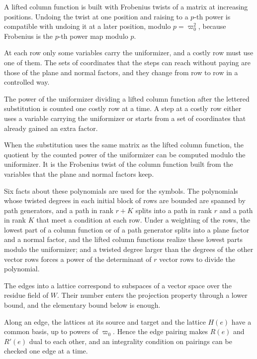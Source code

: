 A lifted column function is built with Frobenius twists of a matrix at increasing positions. Undoing the
twist at one position and raising to a $p$-th power is compatible with undoing it at a later position,
modulo $p=\varpi_0^2$, because Frobenius is the $p$-th power map modulo $p$.

At each row only some variables carry the uniformizer, and a costly row must use one of them. The sets of
coordinates that the steps can reach without paying are those of the plane and normal factors, and they
change from row to row in a controlled way.

The power of the uniformizer dividing a lifted column function after the lettered substitution is counted
one costly row at a time. A step at a costly row either uses a variable carrying the uniformizer or
starts from a set of coordinates that already gained an extra factor.

When the substitution uses the same matrix as the lifted column function, the quotient by the counted
power of the uniformizer can be computed modulo the uniformizer. It is the Frobenius twist of the column
function built from the variables that the plane and normal factors keep.

Six facts about these polynomials are used for the symbols. The polynomials whose twisted degrees in
each initial block of rows are bounded are spanned by path generators, and a path in rank $r+K$ splits
into a path in rank $r$ and a path in rank $K$ that meet a condition at each row. Under a weighting
of the rows, the lowest part of a column function or of a path generator splits into a plane factor
and a normal factor, and the lifted column functions realize these lowest parts modulo the uniformizer;
and a twisted degree larger than the degrees of the other vector rows forces a power of the determinant
of $r$ vector rows to divide the polynomial.

The edges into a lattice correspond to subspaces of a vector space over the residue field of $W$.
Their number enters the projection property through a lower bound, and the elementary bound below is
enough.

Along an edge, the lattices at its source and target and the lattice $H(e)$ have a common basis, up
to powers of $\varpi_0$. Hence the edge pairing makes $R(e)$ and $R'(e)$ dual to each other, and an
integrality condition on pairings can be checked one edge at a time.


